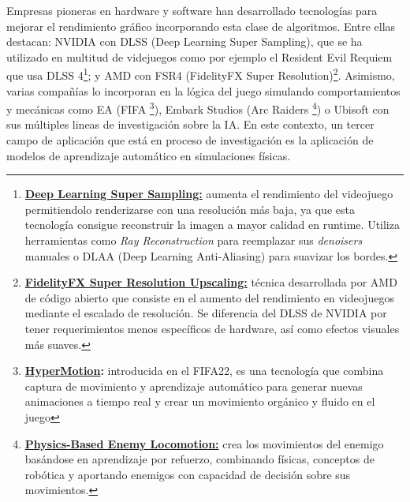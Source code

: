 Empresas pioneras en hardware y software han desarrollado tecnologías para mejorar el rendimiento gráfico incorporando esta clase de algoritmos. Entre ellas destacan: NVIDIA con DLSS (Deep Learning Super Sampling), que se ha utilizado en multitud de videjuegos como por ejemplo el Resident Evil Requiem que usa DLSS 4\footnote{ \textbf{\href{https://www.nvidia.com/es-la/geforce/news/dlss-4-rtx-path-tracing-game-announcements-ces-2026/}{Deep Learning Super Sampling:}} aumenta el rendimiento del videojuego permitiendolo renderizarse con una resolución más baja, ya que esta tecnología consigue reconstruir la imagen a mayor calidad en runtime. Utiliza herramientas como \textit{Ray Reconstruction} para reemplazar sus \textit{denoisers} manuales o DLAA (Deep Learning Anti-Aliasing) para suavizar los bordes.}; y AMD con FSR4 (FidelityFX Super Resolution)\footnote{ \textbf{\href{https://www.amd.com/en/products/graphics/technologies/fidelityfx/super-resolution.html}{FidelityFX Super Resolution Upscaling:}} técnica desarrollada por AMD de código abierto que consiste en el aumento del rendimiento en videojuegos mediante el escalado de resolución. Se diferencia del DLSS de NVIDIA por tener requerimientos menos específicos de hardware, así como efectos visuales más suaves.}. Asimismo, varias compañías lo incorporan en la lógica del juego simulando comportamientos y mecánicas como EA (FIFA \footnote{\textbf{\href{https://news.ea.com/press-releases/press-releases-details/2021/EA-SPORTS-Introduces-FIFA-22-With-Next-Gen-HyperMotion-Technology-Bringing-Footballs-Most-Realistic-and-Immersive-Gameplay-Experience-to-Life/default.aspx}{HyperMotion}:} introducida en el FIFA22, es una tecnología que combina captura de movimiento y aprendizaje automático para generar nuevas animaciones a tiempo real y crear un movimiento orgánico y fluido en el juego}), Embark Studios (Arc Raiders \footnote{\textbf{\href{https://schedule.gdconf.com/session/learning-to-move-physics-based-enemy-locomotion-in-arc-raiders/917319}{Physics-Based Enemy Locomotion:}} crea los movimientos del enemigo basándose en aprendizaje por refuerzo, combinando físicas, conceptos de robótica y aportando enemigos con capacidad de decisión sobre sus movimientos.}) o Ubisoft con sus múltiples lineas de investigación sobre la IA. En este contexto, un tercer campo de aplicación que está en proceso de investigación es la aplicación de modelos de aprendizaje automático en simulaciones físicas. \newline

